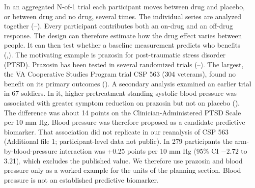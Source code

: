 \documentclass[
  11pt,
]{article}
\begin{document}
In an aggregated N-of-1 trial each participant moves between drug and
placebo, or between drug and no drug, several times. The individual
series are analyzed together (--).
Every participant contributes both an on-drug and an off-drug
response. The design can therefore estimate how the drug effect varies
between people. It can then test whether a baseline measurement
predicts who benefits (,). The motivating
example is prazosin for post-traumatic stress disorder (PTSD).
Prazosin has been tested in several randomized trials
(--). The largest, the VA
Cooperative Studies Program trial CSP 563 (304 veterans), found no
benefit on its primary outcomes (). A secondary analysis
examined an earlier trial in 67 soldiers. In it, higher pretreatment
standing systolic blood pressure was associated with greater symptom
reduction on prazosin but not on placebo (). The
difference was about 14 points on the Clinician-Administered PTSD
Scale per 10 mm Hg.
Blood pressure was therefore proposed as a candidate predictive
biomarker. That association did not replicate in our reanalysis of
CSP 563 (Additional file 1; participant-level data not public). In
279 participants the arm-by-blood-pressure interaction was
+0.25 points per 10 mm Hg (95\% CI \(-2.72\) to 3.21), which excludes
the published value. We therefore use prazosin and blood pressure only
as a worked example for the units of the planning section. Blood
pressure is not an established predictive biomarker.
\end{document}
